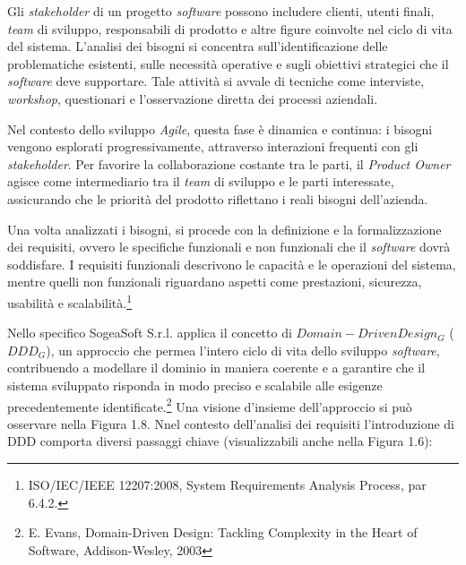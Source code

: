         \noindent Gli \textit{stakeholder} di un progetto \textit{software} possono includere clienti, utenti finali, \textit{team} di sviluppo, responsabili di prodotto e altre figure coinvolte nel ciclo di vita del sistema. L’analisi dei bisogni si concentra sull’identificazione delle problematiche esistenti, sulle necessità operative e sugli obiettivi strategici che il \textit{software} deve supportare. Tale attività si avvale di tecniche come interviste, \textit{workshop}, questionari e l’osservazione diretta dei processi aziendali.

        \noindent Nel contesto dello sviluppo \textit{Agile}, questa fase è dinamica e continua: i bisogni vengono esplorati progressivamente, attraverso interazioni frequenti con gli \textit{stakeholder}. Per favorire la collaborazione costante tra le parti, il \textit{Product Owner} agisce come intermediario tra il \textit{team} di sviluppo e le parti interessate, assicurando che le priorità del prodotto riflettano i reali bisogni dell’azienda.

        \noindent Una volta analizzati i bisogni, si procede con la definizione e la formalizzazione dei requisiti, ovvero le specifiche funzionali e non funzionali che il \textit{software} dovrà soddisfare. I requisiti funzionali descrivono le capacità e le operazioni del sistema, mentre quelli non funzionali riguardano aspetti come prestazioni, sicurezza, usabilità e scalabilità.\footnote{ISO/IEC/IEEE 12207:2008, System Requirements Analysis Process, par 6.4.2.}

        \noindent Nello specifico SogeaSoft S.r.l. applica il concetto di \textit{$Domain-Driven Design_G$} ($DDD_G$), un approccio che permea l’intero ciclo di vita dello sviluppo \textit{software}, contribuendo a modellare il dominio in maniera coerente e a garantire che il sistema sviluppato risponda in modo preciso e scalabile alle esigenze precedentemente identificate.\footnote{E. Evans, Domain-Driven Design: Tackling Complexity in the Heart of Software, Addison-Wesley, 2003} Una visione d'insieme dell'approccio si può osservare nella Figura 1.8.
        Nnel contesto dell'analisi dei requisiti l'introduzione di DDD comporta diversi passaggi chiave (visualizzabili anche nella Figura 1.6):

